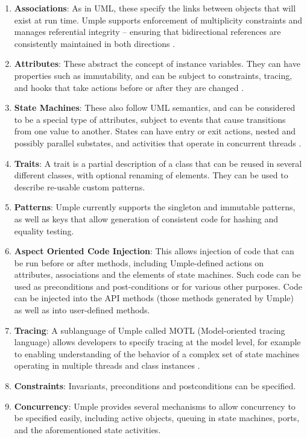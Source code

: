 \begin{enumerate}
 \item 	\textbf{Associations}: As in UML, these specify the links between objects that will exist at run time. Umple supports enforcement of multiplicity constraints and manages referential integrity – ensuring that bidirectional references are consistently maintained in both directions \cite{UmpleAssociations}.
 \item 	\textbf{Attributes}: These abstract the concept of instance variables. They can have properties such as immutability, and can be subject to constraints, tracing, and hooks that take actions before or after they are changed \cite{UmpleAttributes}.
 \item \textbf{	State Machines}: These also follow UML semantics, and can be considered to be a special type of attributes, subject to events that cause transitions from one value to another. States can have entry or exit actions, nested and possibly parallel substates, and activities that operate in concurrent threads \cite{Badreddin2012_Thesis}.
 \item 	\textbf{Traits}: A trait is a partial description of a class that can be reused in several different classes, with optional renaming of elements. They can be used to describe re-usable custom patterns.
 \item 	\textbf{Patterns}: Umple currently supports the singleton and immutable patterns, as well as keys that allow generation of consistent code for hashing and equality testing.
 \item 	\textbf{Aspect Oriented Code Injection}: This allows injection of code that can be run before or after methods, including Umple-defined actions on attributes, associations and the elements of state machines. Such code can be used as preconditions and post-conditions or for various other purposes. Code can be injected into the API methods (those methods generated by Umple) as well as into user-defined methods. 
 \item 	\textbf{Tracing}:  A sublanguage of Umple called MOTL (Model-oriented tracing language) allows developers to specify tracing at the model level, for example to enabling understanding of the behavior of a complex set of state machines operating in multiple threads and class instances \cite{UmpleTracing}.
 \item 	\textbf{Constraints}: Invariants, preconditions and postconditions can be specified.
 \item 	\textbf{Concurrency}: Umple provides several mechanisms to allow concurrency to be specified easily, including active objects, queuing in state machines, ports, and the aforementioned state activities.
\end{enumerate}
